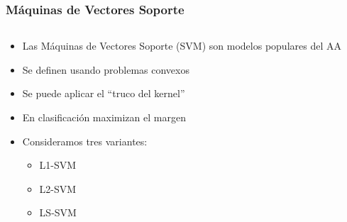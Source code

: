 \documentclass[aspectratio=43,spanish]{beamer}
\begin{document}
\begin{frame}
      \frametitle{Máquinas de Vectores Soporte}

      \begin{columns}
            \begin{column}{0.5\textwidth}
                  \begin{itemize}
                        \item  Las Máquinas de Vectores Soporte (SVM) son modelos populares del AA
                        \item Se definen usando problemas convexos
                        \item Se puede aplicar el ``truco del kernel''
                        \item En clasificación maximizan el margen
                        \item Consideramos tres variantes: 
                        \begin{itemize}
                              \item L1-SVM
                              \item L2-SVM
                              \item LS-SVM
                           \end{itemize}
                  \end{itemize}
                  

\end{column}
\end{columns}
\end{frame}
\end{document}
